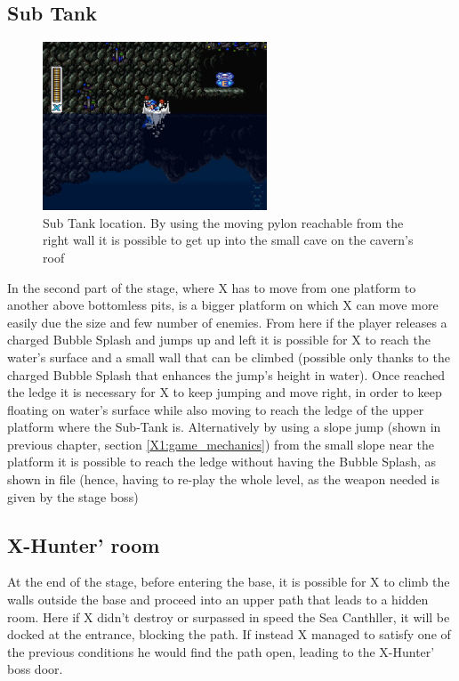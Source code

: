 \subsection{Sub Tank}
\begin{figure}[htp]
	\centering
	\includegraphics[height=5cm]{figures/X2/Bubble_crab/Crab_tank.png}
	\caption{Sub Tank location. By using the moving pylon reachable from the right wall it is possible to get up into the small cave on the cavern's roof}
\end{figure}
In the second part of the stage, where X has to move from one platform to another above bottomless pits, is a bigger platform on which X can move more easily due the size and few number of enemies. From here if the player releases a charged Bubble Splash and jumps up and left it is possible for X to reach the water's surface and a small wall that can be climbed (possible only thanks to the charged Bubble Splash that enhances the jump's height in water). Once reached the ledge it is necessary for X to keep jumping and move right, in order to keep floating on water's surface while also moving to reach the ledge of the upper platform where the Sub-Tank is. Alternatively by using a slope jump (shown in previous chapter, section \ref{X1:game_mechanics}) from the small slope near the platform it is possible to reach the ledge without having the Bubble Splash, as shown in file  (hence, having to re-play the whole level, as the weapon needed is given by the stage boss)



\subsection{X-Hunter' room}
At the end of the stage, before entering the base, it is possible for X to climb the walls outside the base and proceed into an upper path that leads to a hidden room. Here if X didn't destroy or surpassed in speed the Sea Canthller, it will be docked at the entrance, blocking the path. If instead X managed to satisfy one of the previous conditions he would find the path open, leading to the X-Hunter' boss door.

